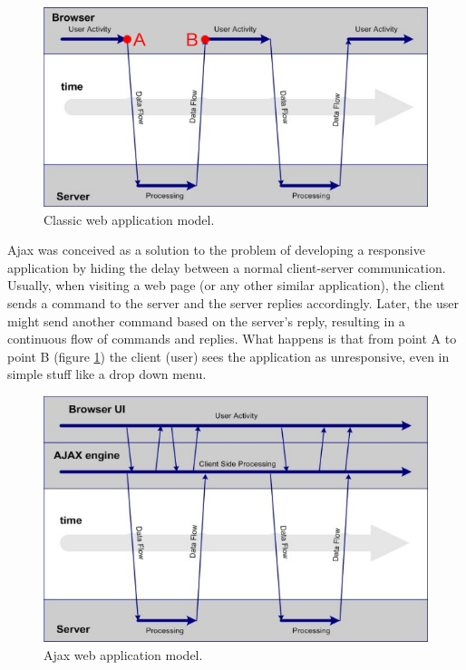 \begin{figure}[h]
    \centering
    \includegraphics[scale=0.7]{img/webapp_model.png}
    \decoRule
    \caption{Classic web application model.}
    \label{fig:webapp_model}
\end{figure}

Ajax was conceived as a solution to the problem of developing a responsive application by hiding the delay between a normal client-server communication. Usually, when visiting a web page (or any other similar application), the client sends a command to the server and the server replies accordingly. Later, the user might send another command based on the server’s reply, resulting in a continuous flow of commands and replies. What happens is that from point A to point B (figure \ref{fig:webapp_model}) the client (user) sees the application as unresponsive, even in simple stuff like a drop down menu.

\begin{figure}[h]
    \centering
    \includegraphics[scale=0.7]{img/ajax_app.png}
    \decoRule
    \caption{Ajax web application model.}
    \label{fig:ajax_app}
\end{figure}

